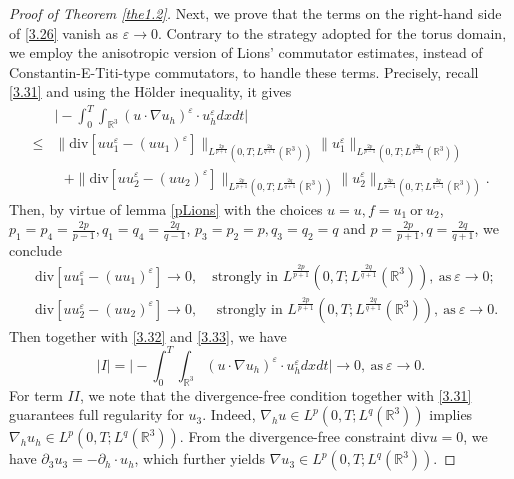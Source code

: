 \documentclass[11pt]{article}
\theoremstyle{plain}\newtheorem{definition}{Definition}[section]
\theoremstyle{definition}\newtheorem{theorem}{Theorem}[section]
\theoremstyle{plain}\newtheorem{lemma}[theorem]{Lemma}
\theoremstyle{plain}\newtheorem{coro}[theorem]{Corollary}
\theoremstyle{plain}\newtheorem{prop}[theorem]{Proposition}
\theoremstyle{remark}\newtheorem{remark}{Remark}[section]
\newcommand{\B}{\Big}
\newcommand{\s}{\mathrm{div}}
\newcommand{\be}{\begin{equation}}
\newcommand{\ee}{\end{equation}}
\newcommand{\ba}{\begin{aligned}}
\newcommand{\ea}{\end{aligned}}
\newcommand{\f}{\frac}
\numberwithin{equation}{section}
\begin{document}
\begin{proof}[Proof of Theorem \ref{the1.2}]
Next, we prove that the terms on the right-hand side of \eqref{3.26} vanish as \(\varepsilon\to 0\). Contrary to the strategy adopted for the torus domain, we employ the anisotropic version of Lions' commutator estimates, instead of Constantin-E-Titi-type commutators, to handle these terms. Precisely, recall \eqref{3.31} and using the H\"older inequality, it gives
\be\label{3.32}\ba
 &\B|- \int_{0}^{T}\int_{\mathbb{R}^{3}} (u\cdot \nabla u_{h})^{\varepsilon}\cdot u_{h}^{\varepsilon} dxdt\B|\\
\leq&\|\s[u u_{1} ^{\varepsilon}-(u u_{1})^{\varepsilon}]\|_{L^{\f{2p}{p+1}}(0,T;L^{\f{2q}{q+1}}(\mathbb{R}^3))}\|u_{1}^{\varepsilon}\| _{L^{\f{2p}{p-1}}(0,T;L^{\f{2q}{q-1}}(\mathbb{R}^3))}\\
&~~~+\|\s[u u_{2} ^{\varepsilon}-(u u_{2})^{\varepsilon}]\|_{L^{\f{2p}{p+1}}(0,T;L^{\f{2q}{q+1}}(\mathbb{R}^3))}\|u_{2}^{\varepsilon}\| _{L^{\f{2p}{p-1}}(0,T;L^{\f{2q}{q-1}}(\mathbb{R}^3))}.
\ea\ee
Then,  by virtue of  lemma \ref{pLions} with the choices $u=u,f=u_1~\text{or}~u_2$, $p_1=p_4=\f{2p}{p-1}, q_1=q_4=\f{2q}{q-1}$, $p_3=p_2=p, q_3=q_2=q$ and $p=\f{2p}{p+1}, q=\f{2q}{q+1}$, we conclude
\be\label{3.33}\ba
&\s[u u_{1} ^{\varepsilon}-(u u_{1})^{\varepsilon}]\to 0, \quad\text{strongly~in } {L^{\f{2p}{p+1}}(0,T;L^{\f{2q}{q+1}}(\mathbb{R}^3))},~\text{as}~\varepsilon\to 0;\\
&\s[u u_{2} ^{\varepsilon}-(u u_{2})^{\varepsilon}] \to 0, \quad\text{ strongly~in } {L^{\f{2p}{p+1}}(0,T;L^{\f{2q}{q+1}}(\mathbb{R}^3))},~\text{as}~\varepsilon\to 0.
\ea\ee
Then together with \eqref{3.32} and \eqref{3.33}, we have
\be\label{3.34}
|I|=\B|- \int_{0}^{T}\int_{\mathbb{R}^{3}} (u\cdot \nabla u_{h})^{\varepsilon}\cdot u_{h}^{\varepsilon} dxdt\B|\to 0, ~\text{as}~\varepsilon \to0.
\ee
For term $II$, we note that the divergence-free condition together with \eqref{3.31} guarantees full regularity for $u_3$. Indeed, $\nabla_h u\in L^p(0,T;L^q(\mathbb R^3))$ implies $\nabla_h u_h\in L^p(0,T;L^q(\mathbb R^3))$. From the divergence-free constraint $\s u=0$, we have $\partial_3 u_3 = -\partial_h\cdot u_h$, which further yields $\nabla u_3\in L^p(0,T;L^q(\mathbb R^3))$.


\end{proof}
\end{document}
